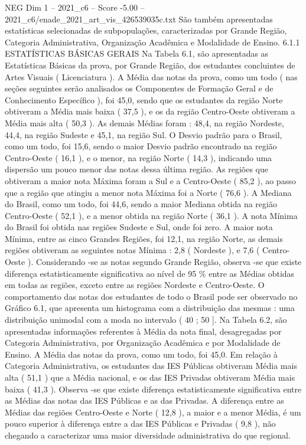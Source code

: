 \begin{textsample}{NEG Dim 1 – 2021\_c6 – Score -5.00 – 2021\_c6/enade\_2021\_art\_vis\_426539035c.txt}
São também apresentadas estatísticas selecionadas de subpopulações, caracterizadas por Grande Região, Categoria Administrativa, Organização Acadêmica e Modalidade de Ensino. 6.1.1 ESTATÍSTICAS BÁSICAS GERAIS Na Tabela 6.1, são apresentadas as Estatísticas Básicas da prova, por Grande Região, dos estudantes concluintes de Artes Visuais ( Licenciatura ).
A Média das notas da prova, como um todo ( nas seções seguintes serão analisados os Componentes de Formação Geral e de Conhecimento Específico ), foi 45,0, sendo que os estudantes da região Norte obtiveram a Média mais baixa ( 37,5 ), e os da região Centro-Oeste obtiveram a Média mais alta ( 50,3 ).
As demais Médias foram : 48,4, na região Nordeste, 44,4, na região Sudeste e 45,1, na região Sul.
O Desvio padrão para o Brasil, como um todo, foi 15,6, sendo o maior Desvio padrão encontrado na região Centro-Oeste ( 16,1 ), e o menor, na região Norte ( 14,3 ), indicando uma dispersão um pouco menor das notas dessa última região.
As regiões que obtiveram a maior nota Máxima foram a Sul e a Centro-Oeste ( 85,2 ), ao passo que a região que atingiu a menor nota Máxima foi a Norte ( 76,6 ).
A Mediana do Brasil, como um todo, foi 44,6, sendo a maior Mediana obtida na região Centro-Oeste ( 52,1 ), e a menor obtida na região Norte ( 36,1 ).
A nota Mínima do Brasil foi obtida nas regiões Sudeste e Sul, onde foi zero.
A maior nota Mínima, entre as cinco Grandes Regiões, foi 12,1, na região Norte, as demais regiões obtiveram as seguintes notas Mínima : 2,8 ( Nordeste ), e 7,6 ( Centro-Oeste ).
Considerando -se as notas segundo Grande Região, observa -se que existe diferença estatisticamente significativa ao nível de 95 \% entre as Médias obtidas em todas as regiões, exceto entre as regiões Nordeste e Centro-Oeste.
O comportamento das notas dos estudantes de todo o Brasil pode ser observado no Gráfico 6.1, que apresenta um histograma com a distribuição das mesmas : uma distribuição unimodal com a moda no intervalo ( 40 ; 50 ].
Na Tabela 6.2, são apresentadas informações referentes à Média da nota final, desagregadas por Categoria Administrativa, por Organização Acadêmica e por Modalidade de Ensino.
A Média das notas da prova, como um todo, foi 45,0.
Em relação à Categoria Administrativa, os estudantes das IES Públicas obtiveram Média mais alta ( 51,1 ) que a Média nacional, e os das IES Privadas obtiveram Média mais baixa ( 41,3 ).
Observa -se que existe diferença estatisticamente significativa entre as Médias das notas das IES Públicas e as das Privadas.
A diferença entre as Médias das regiões Centro-Oeste e Norte ( 12,8 ), a maior e a menor Média, é um pouco superior à diferença entre a das IES Públicas e Privadas ( 9,8 ), não chegando a caracterizar uma maior diversidade administrativa do que regional.

\end{textsample}
